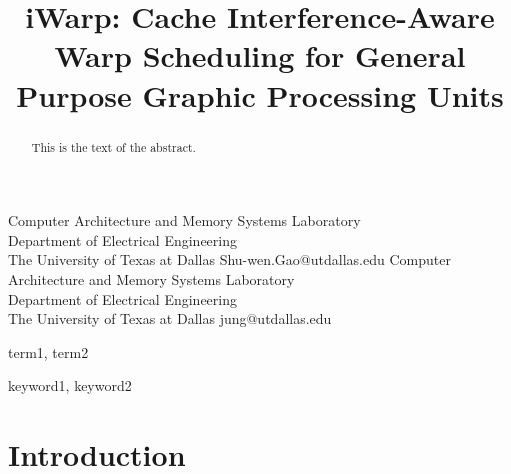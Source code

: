 \documentclass{sigplanconf}
\begin{document}
\setlength{\pdfpageheight}{\paperheight}
\setlength{\pdfpagewidth}{\paperwidth}






\title{iWarp: Cache Interference-Aware Warp Scheduling for General Purpose Graphic Processing Units}

           {Computer Architecture and Memory Systems Laboratory\\Department of Electrical Engineering\\The University of Texas at Dallas}
           {Shu-wen.Gao@utdallas.edu}
           {Computer Architecture and Memory Systems Laboratory\\Department of Electrical Engineering\\The University of Texas at Dallas}
           {jung@utdallas.edu}

\maketitle

\begin{abstract}
This is the text of the abstract.
\end{abstract}


\terms
term1, term2

\keywords
keyword1, keyword2

\section{Introduction}
\end{document}
